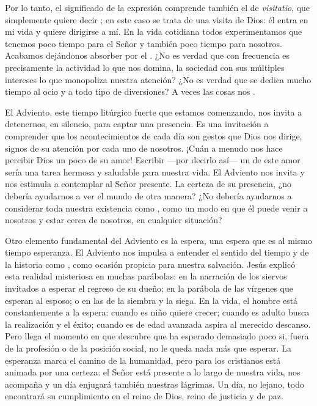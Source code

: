 Por lo tanto, el significado de la expresión  comprende también el de \emph{visitatio}, que simplemente quiere decir ; en este caso se trata de una visita de Dios: él entra en mi vida y quiere dirigirse a mí. En la vida cotidiana todos experimentamos que tenemos poco tiempo para el Señor y también poco tiempo para nosotros. Acabamos dejándonos absorber por el . ¿No es verdad que con frecuencia es precisamente la actividad lo que nos domina, la sociedad con sus múltiples intereses lo que monopoliza nuestra atención? ¿No es verdad que se dedica mucho tiempo al ocio y a todo tipo de diversiones? A veces las cosas nos .

El Adviento, este tiempo litúrgico fuerte que estamos comenzando, nos invita a detenernos, en silencio, para captar una presencia. Es una invitación a comprender que los acontecimientos de cada día son gestos que Dios nos dirige, signos de su atención por cada uno de nosotros. ¡Cuán a menudo nos hace percibir Dios un poco de su amor! Escribir ---por decirlo así--- un  de este amor sería una tarea hermosa y saludable para nuestra vida. El Adviento nos invita y nos estimula a contemplar al Señor presente. La certeza de su presencia, ¿no debería ayudarnos a ver el mundo de otra manera? ¿No debería ayudarnos a considerar toda nuestra existencia como , como un modo en que él puede venir a nosotros y estar cerca de nosotros, en cualquier situación?

Otro elemento fundamental del Adviento es la espera, una espera que es al mismo tiempo esperanza. El Adviento nos impulsa a entender el sentido del tiempo y de la historia como , como ocasión propicia para nuestra salvación. Jesús explicó esta realidad misteriosa en muchas parábolas: en la narración de los siervos invitados a esperar el regreso de su dueño; en la parábola de las vírgenes que esperan al esposo; o en las de la siembra y la siega. En la vida, el hombre está constantemente a la espera: cuando es niño quiere crecer; cuando es adulto busca la realización y el éxito; cuando es de edad avanzada aspira al merecido descanso. Pero llega el momento en que descubre que ha esperado demasiado poco si, fuera de la profesión o de la posición social, no le queda nada más que esperar. La esperanza marca el camino de la humanidad, pero para los cristianos está animada por una certeza: el Señor está presente a lo largo de nuestra vida, nos acompaña y un día enjugará también nuestras lágrimas. Un día, no lejano, todo encontrará su cumplimiento en el reino de Dios, reino de justicia y de paz.

